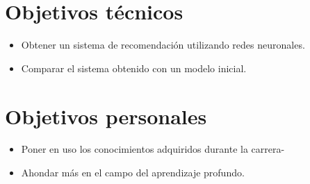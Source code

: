 
\section{Objetivos técnicos}\label{objetivos-tecnicos}
\begin{itemize}
\tightlist
\item Obtener un sistema de recomendación utilizando redes neuronales.
\item Comparar el sistema obtenido con un modelo inicial.
\end{itemize}

\section{Objetivos personales}\label{objetivos-personales}
\begin{itemize}
\tightlist
\item Poner en uso los conocimientos adquiridos durante la carrera-
\item Ahondar más en el campo del aprendizaje profundo.
\end{itemize}


